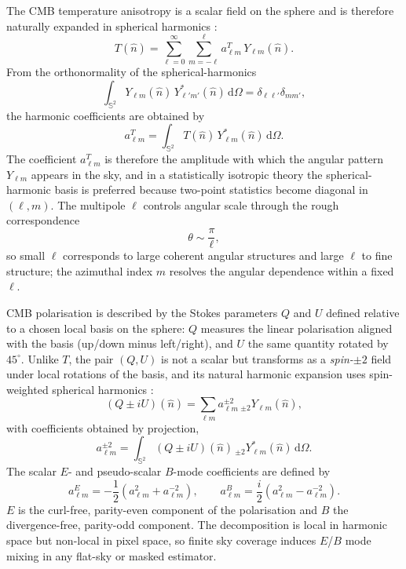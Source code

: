 \documentclass[11pt]{article}
\newcommand{\dd}{\mathrm{d}}
\theoremstyle{definition}
\begin{document}
The CMB temperature anisotropy is a scalar field on the sphere and is therefore naturally expanded in spherical harmonics \cite{zaldarriaga1997,gorski2005,scott2024pdg}:
\begin{equation}
  T(\hat n) = \sum_{\ell=0}^\infty \sum_{m=-\ell}^{\ell} a_{\ell m}^T\,Y_{\ell m}(\hat n).
\end{equation}
From the orthonormality of the spherical-harmonics
\begin{equation}
  \int_{\mathbb S^2} Y_{\ell m}(\hat n)\,Y_{\ell' m'}^\ast(\hat n)\,\dd\Omega
  =
  \delta_{\ell\ell'}\delta_{mm'},
\end{equation}
the harmonic coefficients are obtained by
\begin{equation}
  a_{\ell m}^T
  =
  \int_{\mathbb S^2} T(\hat n)\,Y_{\ell m}^\ast(\hat n)\,\dd\Omega.
\end{equation}
The coefficient \(a_{\ell m}^T\) is therefore the amplitude with which the angular pattern \(Y_{\ell m}\) appears in the sky, and in a statistically isotropic theory the spherical-harmonic basis is preferred because two-point statistics become diagonal in \((\ell,m)\). The multipole \(\ell\) controls angular scale through the rough correspondence
\begin{equation}
  \theta \sim \frac{\pi}{\ell},
\end{equation}
so small \(\ell\) corresponds to large coherent angular structures and large \(\ell\) to fine structure; the azimuthal index \(m\) resolves the angular dependence within a fixed \(\ell\).

CMB polarisation is described by the Stokes parameters \(Q\) and \(U\) defined relative to a chosen local basis on the sphere: \(Q\) measures the linear polarisation aligned with the basis (up/down minus left/right), and \(U\) the same quantity rotated by \(45^\circ\). Unlike \(T\), the pair \((Q,U)\) is not a scalar but transforms as a \emph{spin-\(\pm 2\)} field under local rotations of the basis, and its natural harmonic expansion uses spin-weighted spherical harmonics \cite{zaldarriaga1997,kamionkowski1997,sullivan2024methods}:
\begin{equation}
  (Q \pm iU)(\hat n)
  =
  \sum_{\ell m}
  a_{\ell m}^{\pm 2}\,{}_{\pm 2}Y_{\ell m}(\hat n),
\end{equation}
with coefficients obtained by projection,
\begin{equation}
  a_{\ell m}^{\pm 2}
  =
  \int_{\mathbb S^2}
  (Q\pm iU)(\hat n)\,{}_{\pm 2}Y_{\ell m}^\ast(\hat n)\,\dd\Omega.
\end{equation}
The scalar \(E\)- and pseudo-scalar \(B\)-mode coefficients are defined by \cite{zaldarriaga1997,kamionkowski1997}
\begin{equation}
  a_{\ell m}^E = -\frac12\left(a_{\ell m}^{2}+a_{\ell m}^{-2}\right),
  \qquad
  a_{\ell m}^B = \frac{i}{2}\left(a_{\ell m}^{2}-a_{\ell m}^{-2}\right).
\end{equation}
\(E\) is the curl-free, parity-even component of the polarisation and \(B\) the divergence-free, parity-odd component. The decomposition is local in harmonic space but non-local in pixel space, so finite sky coverage induces \(E\)/\(B\) mode mixing in any flat-sky or masked estimator.
\end{document}
